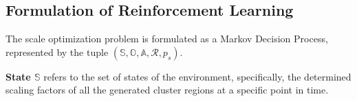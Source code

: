 \documentclass[letterpaper]{article} %
\newcommand\rjf[1]{\textcolor{red}{\{RJF: #1\}}}
\newcommand\yxy[1]{\textcolor{blue}{\{YXY: #1\}}}
\newcommand\qz[1]{\textcolor{blue}{\{QZ: #1\}}}
\begin{document}




\subsection{Formulation of Reinforcement Learning}
\label{sssec:problemFormulation}
The scale optimization problem is formulated as a Markov Decision Process, represented by the tuple $(\mathbb{S}, \mathbb{O}, \mathbb{A}, \mathcal{R}, p_s)$. 

\noindent\textbf{State $\mathbb{S}$} 
refers to the set of states of the environment, specifically, the determined scaling factors of all the generated cluster regions at a specific point in time. %
\end{document}
